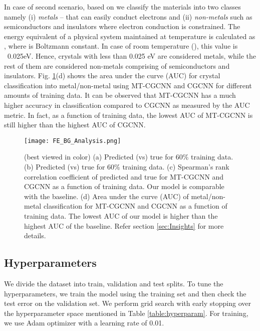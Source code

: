 \documentclass{article}
\newcommand{\method}[1]{MT-CGCNN}
\newcommand{\baseline}[1]{CGCNN}
\newcommand{\proponesym}[1]{}
\newcommand{\proptwosym}[1]{}
\begin{document}
In case of second scenario, based on \proptwosym{} we classify the materials into two classes namely (i) \textit{metals} -- that can easily conduct electrons and (ii) \textit{non-metals} such as semiconductors and insulators where electron conduction is constrained. The energy equivalent of a physical system maintained at temperature  is calculated as , where  is Boltzmann constant. In case of room temperature (), this value is ~0.025eV. Hence, crystals with \proptwosym{} less than 0.025 eV are considered metals, while the rest of them are considered non-metals comprising of semiconductors and insulators. Fig. \ref{fig:reduced_data}(d) shows the area under the curve (AUC) for crystal classification into metal/non-metal using \method{} and \baseline{} for different amounts of training data. It can be observed that \method{} has a much higher accuracy in classification compared to \baseline{} as measured by the AUC metric. In fact, as a function of training data, the lowest AUC of \method{} is still higher than the highest AUC of \baseline{}.

\begin{figure}[htp]
\centering
\texttt{[image: FE\_BG\_Analysis.png]}\hfill
\caption{(best viewed in color) (a) Predicted \proponesym{} (vs) true \proponesym{} for 60\% training data. (b) Predicted \proptwosym{} (vs) true \proptwosym{} for 60\% training data. (c) Spearman's rank correlation coefficient   of predicted \proponesym{} and true \proponesym{} for \method{} and \baseline{} as a function of training data. Our model is comparable with the baseline. (d) Area under the curve (AUC) of metal/non-metal classification for \method{} and \baseline{} as a function of training data. The lowest AUC of our model is higher than the highest AUC of the baseline. Refer section \ref{sec:Insights} for more details.}
\label{fig:reduced_data}
\end{figure}

\subsection{Hyperparameters}
\label{sec:hyperparams}
We divide the dataset into train, validation and test splits. To tune the hyperparameters, we train the model using the training set and then check the test error on the validation set. We perform grid search with early stopping over the hyperparameter space mentioned in Table \ref{table:hyperparam}. For training, we use Adam optimizer \citep{KingmaB14} with a learning rate of 0.01.
\end{document}
